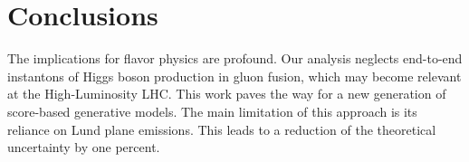 \section{Conclusions}\label{sec:conclusions}

The implications for flavor physics are profound. Our analysis neglects
end-to-end instantons of Higgs boson production in gluon fusion, which
may become relevant at the High-Luminosity LHC. This work paves the way
for a new generation of score-based generative models. The main
limitation of this approach is its reliance on Lund plane emissions.
This leads to a reduction of the theoretical uncertainty by one percent.

